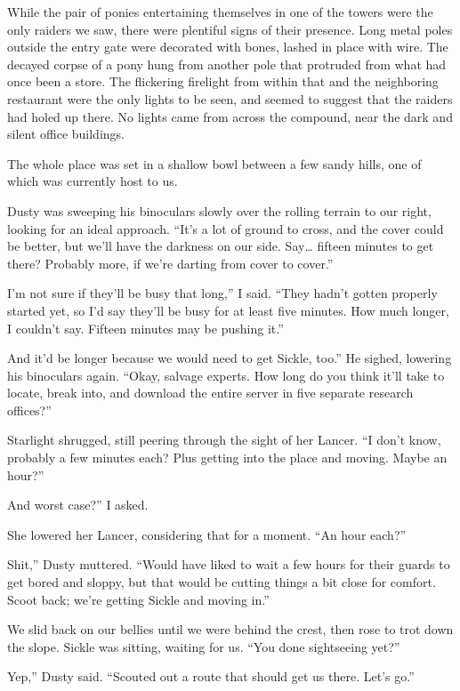 While the pair of ponies entertaining themselves in one of the towers were the only raiders we saw, there were plentiful signs of their presence. Long metal poles outside the entry gate were decorated with bones, lashed in place with wire. The decayed corpse of a pony hung from another pole that protruded from what had once been a store. The flickering firelight from within that and the neighboring restaurant were the only lights to be seen, and seemed to suggest that the raiders had holed up there. No lights came from across the compound, near the dark and silent office buildings.

The whole place was set in a shallow bowl between a few sandy hills, one of which was currently host to us.

Dusty was sweeping his binoculars slowly over the rolling terrain to our right, looking for an ideal approach. “It’s a lot of ground to cross, and the cover could be better, but we’ll have the darkness on our side. Say… fifteen minutes to get there? Probably more, if we’re darting from cover to cover.”

\leavevmode{}I’m not sure if they’ll be busy that long,” I said. “They hadn’t gotten properly started yet, so I’d say they’ll be busy for at least five minutes. How much longer, I couldn’t say. Fifteen minutes may be pushing it.”

\leavevmode{}And it’d be longer because we would need to get Sickle, too.” He sighed, lowering his binoculars again. “Okay, salvage experts. How long do you think it’ll take to locate, break into, and download the entire server in five separate research offices?”

Starlight shrugged, still peering through the sight of her Lancer. “I don’t know, probably a few minutes each? Plus getting into the place and moving. Maybe an hour?”

\leavevmode{}And worst case?” I asked.

She lowered her Lancer, considering that for a moment. “An hour each?”

\leavevmode{}Shit,” Dusty muttered. “Would have liked to wait a few hours for their guards to get bored and sloppy, but that would be cutting things a bit close for comfort. Scoot back; we’re getting Sickle and moving in.”

We slid back on our bellies until we were behind the crest, then rose to trot down the slope. Sickle was sitting, waiting for us. “You done sightseeing yet?”

\leavevmode{}Yep,” Dusty said. “Scouted out a route that should get us there. Let’s go.”

